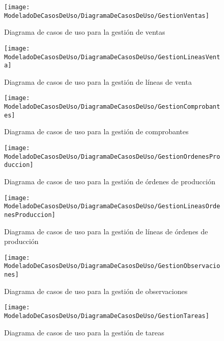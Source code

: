     \begin{figure}[H]
		\centering
		\texttt{[image: ModeladoDeCasosDeUso/DiagramaDeCasosDeUso/GestionVentas]}
		\caption{Diagrama de casos de uso para la gestión de ventas}
	\label{fig:GestionVentas}
    \end{figure}
    \begin{figure}[H]
		\centering
		\texttt{[image: ModeladoDeCasosDeUso/DiagramaDeCasosDeUso/GestionLineasVenta]}
		\caption{Diagrama de casos de uso para la gestión de líneas de venta}
	\label{fig:GestionLineasVenta}
    \end{figure}
    \begin{figure}[H]
		\centering
		\texttt{[image: ModeladoDeCasosDeUso/DiagramaDeCasosDeUso/GestionComprobantes]}
		\caption{Diagrama de casos de uso para la gestión de comprobantes}
	\label{fig:GestionComprobantes}
    \end{figure}
    \begin{figure}[H]
		\centering
		\texttt{[image: ModeladoDeCasosDeUso/DiagramaDeCasosDeUso/GestionOrdenesProduccion]}
		\caption{Diagrama de casos de uso para la gestión de órdenes de producción}
	\label{fig:GestionOrdenesProduccion}
    \end{figure}
    \begin{figure}[H]
		\centering
		\texttt{[image: ModeladoDeCasosDeUso/DiagramaDeCasosDeUso/GestionLineasOrdenesProduccion]}
		\caption{Diagrama de casos de uso para la gestión de líneas de órdenes de producción}
	\label{fig:GestionLineasOrdenesProduccion}
    \end{figure}
    \begin{figure}[H]
		\centering
		\texttt{[image: ModeladoDeCasosDeUso/DiagramaDeCasosDeUso/GestionObservaciones]}
		\caption{Diagrama de casos de uso para la gestión de observaciones}
	\label{fig:GestionObservaciones}
	\end{figure}
	\begin{figure}[H]
		\centering
		\texttt{[image: ModeladoDeCasosDeUso/DiagramaDeCasosDeUso/GestionTareas]}
		\caption{Diagrama de casos de uso para la gestión de tareas}
	\label{fig:GestionObservaciones}
	\end{figure}
	\clearpage %
